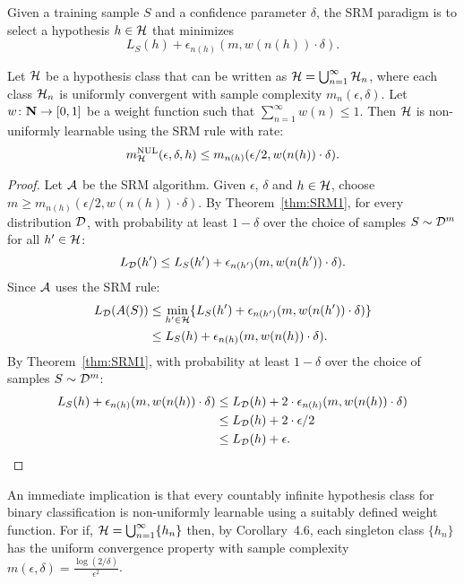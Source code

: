 Given a training sample $S$ and a confidence parameter $\delta$, 
the SRM paradigm is to select a hypothesis $h \in \mathcal{H}$ that minimizes
\[
    L_S(h) + \epsilon_{n(h)} (m, w( n(h) ) \cdot \delta).
\]
\begin{theorem}
\label{thm:SRM2}
Let $\mathcal{H}$ be a hypothesis class that can be written as $\mathcal{H} =
\bigcup_{n = 1}^{\infty} \mathcal{H}_n$, where each class $\mathcal{H}_n$ is
uniformly convergent with sample complexity $m_n(\epsilon, \delta)$. Let $w
\colon \mathbf{N} \rightarrow [0, 1]$ be a weight function such that  $\sum_{n =
1}^{\infty} w(n) \leq 1$. Then $\mathcal{H}$ is non-uniformly learnable 
using the SRM rule with rate:
\[
    m_{\mathcal{H}}^{\text{NUL}} (\epsilon, \delta, h) \leq m_{n(h)} (\epsilon / 2, w( n(h) ) \cdot \delta).
\]
\end{theorem}
\begin{proof}
Let $\mathcal{A}$ be the SRM algorithm. Given $\epsilon$, $\delta$ and $h \in \mathcal{H}$, 
choose $m \geq m_{n(h)} (\epsilon / 2, w( n (h) ) \cdot \delta)$. By Theorem~\ref{thm:SRM1}, 
for every distribution $\mathcal{D}$, with probability at least  $1 - \delta$ over the choice
of samples $S \sim \mathcal{D}^m$ for all $h' \in \mathcal{H}$:
\[
    L_{\mathcal{D}} (h') \leq L_S(h') + \epsilon_{n(h')} (m, w( n(h') ) \cdot \delta).
\]
Since $\mathcal{A}$ uses the SRM rule:
\begin{align*}
    L_{\mathcal{D}} (A(S)) 
        &  \leq \min_{h' \in \mathcal{H}} \{ 
            L_S(h') + \epsilon_{n(h')} (m, w( n(h') ) \cdot \delta) \} \\
        & \leq L_S(h) +  \epsilon_{n(h)} (m, w( n(h) ) \cdot \delta). \\
\end{align*}
By Theorem~\ref{thm:SRM1}, with probability at least  $1 - \delta$ over the choice of samples 
$S \sim \mathcal{D}^m$:
\begin{align*}
    L_S(h) +  \epsilon_{n(h)} (m, w( n(h) ) \cdot \delta) 
        & \leq L_{\mathcal{D}}(h) +  2 \cdot \epsilon_{n(h)} (m, w( n(h) ) \cdot \delta) \\
        & \leq L_{\mathcal{D}}(h) + 2 \cdot \epsilon / 2 \\
        & \leq L_{\mathcal{D}}(h) + \epsilon.
\end{align*}
\end{proof}

An immediate implication is that every countably infinite hypothesis class for 
binary classification is non-uniformly learnable using a suitably defined weight 
function. For if, $\mathcal{H} = \bigcup_{n = 1}^{\infty} \{ h_n \}$ then, by 
Corollary~4.6, each singleton class $\{ h_n \}$ has the uniform convergence property with 
sample complexity $m (\epsilon, \delta) = \frac{\log (2 / \delta)}{\epsilon^2}$.


